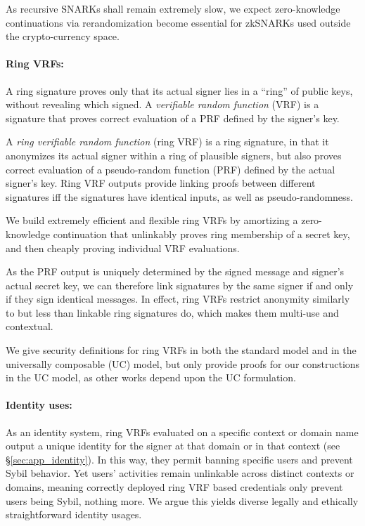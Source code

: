 As recursive SNARKs shall remain extremely slow,
we expect zero-knowledge continuations via rerandomization become
essential for zkSNARKs used outside the crypto-currency space.

\paragraph{Ring VRFs:}

A ring signature proves only that its actual signer lies in a ``ring''
of public keys, without revealing which signed.
A {\it verifiable random function} (VRF) is a signature that proves
correct evaluation of a PRF defined by the signer's key.

A {\it ring verifiable random function} (ring VRF) is a ring signature, in
that it anonymizes its actual signer within a ring of plausible signers,
but also proves correct evaluation of a pseudo-random function (PRF)
defined by the actual signer's key. %
%
Ring VRF outputs provide linking proofs between different signatures iff
the signatures have identical inputs, as well as pseudo-randomness.

We build extremely efficient and flexible ring VRFs by amortizing a
zero-knowledge continuation that unlinkably proves ring membership
of a secret key, and then cheaply proving individual VRF evaluations.

As the PRF output is uniquely determined by the signed message and
signer's actual secret key, we can therefore link signatures by the
same signer if and only if they sign identical messages.
In effect, ring VRFs restrict anonymity similarly to but less than
 linkable ring signatures do, which makes them multi-use and contextual.

We give security definitions for ring VRFs in both the standard model
and in the universally composable (UC) \cite{canetti1,canetti2} model,
but only provide proofs for our constructions in the UC model, as other
works depend upon the UC formulation.

\paragraph{Identity uses:}

As an identity system, ring VRFs evaluated on a specific context or
domain name output a unique identity for the signer at that domain or
in that context (see \S\ref{sec:app_identity}).
In this way, they permit banning specific users and prevent Sybil behavior.
Yet users' activities remain unlinkable across distinct contexts or
domains, meaning correctly deployed ring VRF based credentials
only prevent users being Sybil, nothing more.  We argue this yields
diverse legally and ethically straightforward identity usages.

